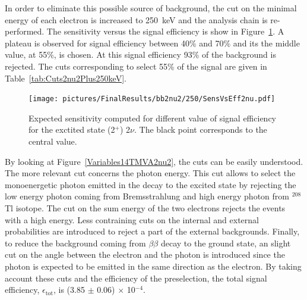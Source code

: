 \documentclass[main.tex]{subfiles}
\begin{document}
\bigskip


\NI In order to eliminate this possible source of background, the cut on the minimal energy of each electron is increased to 250~keV and the analysis chain is re-performed. The sensitivity versus the signal efficiency is show in Figure~\ref{plot:SensVsEff_250}. A plateau is observed for signal efficiency between 40\% and 70\% and its the middle value, at 55\%, is chosen. At this signal efficiency 93\% of the background is rejected. The cuts corresponding to select 55\% of the signal are given in Table~\ref{tab:Cuts2nu2Plus250keV}.


\begin{figure} [h!]
\begin{center}
\texttt{[image: pictures/FinalResults/bb2nu2/250/SensVsEff2nu.pdf]}
\end{center}
\caption{Expected sensitivity computed for different value of signal efficiency for the exctited state (2$^+$) 2$\nu$. The black point corresponds to the central value.}
\label{plot:SensVsEff_250}
\end{figure}


\bigskip


\NI By looking at Figure~\ref{Variables14TMVA2nu2}, the cuts can be easily understood. The more relevant cut concerns the photon energy. This cut allows to select the monoenergetic photon emitted in the decay to the excited state by rejecting the low energy photon coming from Bremsstrahlung and high energy photon from $^{\text{208}}$Tl isotope. The cut on the sum energy of the two electrons rejects the events with a high energy. Less contraining cuts on the internal and external probabilities are introduced to reject a part of the external backgrounds. Finally, to reduce the background coming from $\beta\beta$ decay to the ground state, an slight cut on the angle between the electron and the photon is introduced since the photon is expected to be emitted in the same direction as the electron. By taking account these cuts and the efficiency of the preselection, the total signal efficiency, $\epsilon_{\text{tot}}$, is (3.85 $\pm$ 0.06) $\times$ 10$^{-\text{4}}$. 


\FloatBarrier
\end{document}

